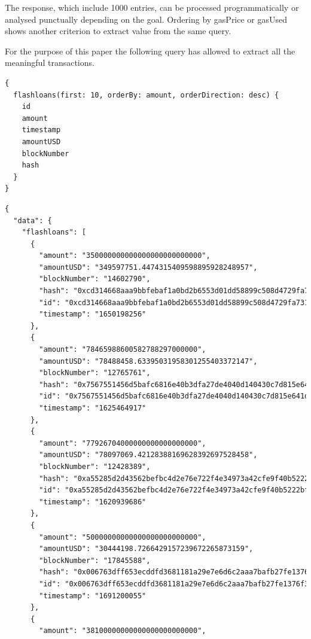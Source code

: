 \documentclass[11pt,a4paper,titlepage]{scrartcl}
\begin{document}
The response, which include 1000 entries, can be processed programmatically or analysed punctually depending on the goal. Ordering by gasPrice or gasUsed shows  another criterion to extract value from the same query.


For the purpose of this paper the following query has allowed to extract all the meaningful transactions.

\begin{lstlisting}[language=xml, caption={ JSON request for top 10  usd amount flashloans }, label={lst:fl_topten}, basicstyle=\ttfamily\scriptsize]
{
  flashloans(first: 10, orderBy: amount, orderDirection: desc) {
    id
    amount
    timestamp
    amountUSD
    blockNumber
    hash
  }
}
\end{lstlisting}


\begin{lstlisting}[language=xml, caption={ JSON response for top 10 usd amount flashloans}, label={lst:fl_topten_rsp}, basicstyle=\ttfamily\scriptsize]
{
  "data": {
    "flashloans": [
      {
        "amount": "350000000000000000000000000",
        "amountUSD": "349597751.4474315409598895928248957",
        "blockNumber": "14602790",
        "hash": "0xcd314668aaa9bbfebaf1a0bd2b6553d01dd58899c508d4729fa7311dc5d33ad7",
        "id": "0xcd314668aaa9bbfebaf1a0bd2b6553d01dd58899c508d4729fa7311dc5d33ad76900000006000000",
        "timestamp": "1650198256"
      },
      {
        "amount": "78465988600582788297000000",
        "amountUSD": "78488458.63395031958301255403372147",
        "blockNumber": "12765761",
        "hash": "0x7567551456d5bafc6816e40b3dfa27de4040d140430c7d815e641d301755fb0b",
        "id": "0x7567551456d5bafc6816e40b3dfa27de4040d140430c7d815e641d301755fb0b3001000006000000",
        "timestamp": "1625464917"
      },
      {
        "amount": "77926704000000000000000000",
        "amountUSD": "78097069.42128388169628392697528458",
        "blockNumber": "12428389",
        "hash": "0xa55285d2d43562befbc4d2e76e722f4e34973a42cfe9f40b5222bf0f68bb8841",
        "id": "0xa55285d2d43562befbc4d2e76e722f4e34973a42cfe9f40b5222bf0f68bb8841a500000006000000",
        "timestamp": "1620939686"
      },
      {
        "amount": "50000000000000000000000000",
        "amountUSD": "30444198.7266429157239672265873159",
        "blockNumber": "17845588",
        "hash": "0x006763dff653ecddfd3681181a29e7e6d6c2aaa7bafb27fe1376f3f7ce367c1e",
        "id": "0x006763dff653ecddfd3681181a29e7e6d6c2aaa7bafb27fe1376f3f7ce367c1ea102000006000000",
        "timestamp": "1691200055"
      },
      {
        "amount": "38100000000000000000000000",

\end{lstlisting}
\end{document}
